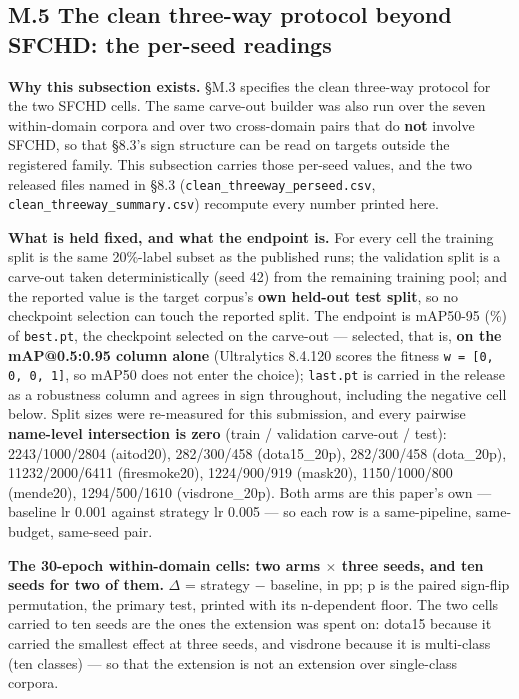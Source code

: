 \documentclass[pdflatex,sn-mathphys-ay]{sn-jnl}
\begin{document}
\subsection*{M.5 The clean three-way protocol beyond SFCHD: the per-seed readings}

\textbf{Why this subsection exists.} \S{}M.3 specifies the clean three-way protocol for the two SFCHD cells. The same carve-out builder was also run over the seven within-domain corpora and over two cross-domain pairs that do \textbf{not} involve SFCHD, so that \S{}8.3's sign structure can be read on targets outside the registered family. This subsection carries those per-seed values, and the two released files named in \S{}8.3 (\texttt{clean\_threeway\_perseed.csv}, \texttt{clean\_threeway\_summary.csv}) recompute every number printed here.

\textbf{What is held fixed, and what the endpoint is.} For every cell the training split is the same 20\%-label subset as the published runs; the validation split is a carve-out taken deterministically (seed 42) from the remaining training pool; and the reported value is the target corpus's \textbf{own held-out test split}, so no checkpoint selection can touch the reported split. The endpoint is mAP50-95 (\%) of \texttt{best.pt}, the checkpoint selected on the carve-out --- selected, that is, \textbf{on the mAP@0.5:0.95 column alone} (Ultralytics 8.4.120 scores the fitness \texttt{w = [0, 0, 0, 1]}, so mAP50 does not enter the choice); \texttt{last.pt} is carried in the release as a robustness column and agrees in sign throughout, including the negative cell below. Split sizes were re-measured for this submission, and every pairwise \textbf{name-level intersection is zero} (train / validation carve-out / test): 2243/1000/2804 (aitod20), 282/300/458 (dota15\_20p), 282/300/458 (dota\_20p), 11232/2000/6411 (firesmoke20), 1224/900/919 (mask20), 1150/1000/800 (mende20), 1294/500/1610 (visdrone\_20p). Both arms are this paper's own --- baseline lr 0.001 against strategy lr 0.005 --- so each row is a same-pipeline, same-budget, same-seed pair.

\textbf{The 30-epoch within-domain cells: two arms \ensuremath{\times} three seeds, and ten seeds for two of them.} \ensuremath{\Delta} = strategy \ensuremath{-} baseline, in pp; p is the paired sign-flip permutation, the primary test, printed with its n-dependent floor. The two cells carried to ten seeds are the ones the extension was spent on: dota15 because it carried the smallest effect at three seeds, and visdrone because it is multi-class (ten classes) --- so that the extension is not an extension over single-class corpora.
\end{document}
